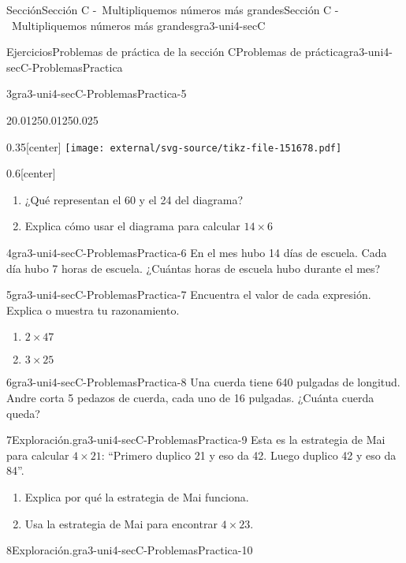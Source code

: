 \documentclass[twoside,14pt,]{extarticle}
\begin{document}
\begin{sectionptx}{Sección}{Sección C -~Multipliquemos números más grandes}{}{Sección C -~Multipliquemos números más grandes}{}{}{gra3-uni4-secC}
\begin{exercises-subsection}{Ejercicios}{Problemas de práctica de la sección C}{}{Problemas de práctica}{}{}{gra3-uni4-secC-ProblemasPractica}
\begin{divisionexercise}{3}{}{}{gra3-uni4-secC-ProblemasPractica-5}
\begin{sidebyside}{2}{0.0125}{0.0125}{0.025}
\begin{sbspanel}{0.35}[center]%
\texttt{[image: external/svg-source/tikz-file-151678.pdf]}
\end{sbspanel}%
\begin{sbspanel}{0.6}[center]%
%
\begin{enumerate}[label=(\alph*)]
\item{}¿Qué representan el 60 y el 24 del diagrama?%
\item{}Explica cómo usar el diagrama para calcular \(14 \times 6\)%
\end{enumerate}
\end{sbspanel}%
\end{sidebyside}%
\end{divisionexercise}%
\begin{divisionexercise}{4}{}{}{gra3-uni4-secC-ProblemasPractica-6}%
En el mes hubo 14 días de escuela. Cada día hubo 7 horas de escuela. ¿Cuántas horas de escuela hubo durante el mes?%
\end{divisionexercise}%
\begin{divisionexercise}{5}{}{}{gra3-uni4-secC-ProblemasPractica-7}%
Encuentra el valor de cada expresión. Explica o muestra tu razonamiento.%
%
\begin{enumerate}[label=(\alph*)]
\item{}\(\displaystyle 2 \times 47\)%
\item{}\(\displaystyle 3 \times 25\)%
\end{enumerate}
\end{divisionexercise}%
\begin{divisionexercise}{6}{}{}{gra3-uni4-secC-ProblemasPractica-8}%
Una cuerda tiene 640 pulgadas de longitud. Andre corta 5 pedazos de cuerda, cada uno de 16 pulgadas. ¿Cuánta cuerda queda?%
\end{divisionexercise}%
\begin{divisionexercise}{7}{Exploración.}{}{gra3-uni4-secC-ProblemasPractica-9}%
Esta es la estrategia de Mai para calcular \(4 \times 21\): “Primero duplico 21 y eso da 42. Luego duplico 42 y eso da 84”.%
%
\begin{enumerate}[label=(\alph*)]
\item{}Explica por qué la estrategia de Mai funciona.%
\item{}Usa la estrategia de Mai para encontrar \(4 \times 23\).%
\end{enumerate}
\end{divisionexercise}%
\begin{divisionexercise}{8}{Exploración.}{}{gra3-uni4-secC-ProblemasPractica-10}%

\end{divisionexercise}
\end{exercises-subsection}
\end{sectionptx}
\end{document}
